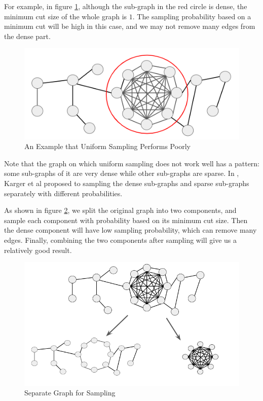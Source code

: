 \documentclass{article}
\begin{document}
For example, in figure \ref{fig:dense_spase}, although the sub-graph in the red circle is dense, the minimum cut size of the whole graph is $1$. The sampling probability based on a minimum cut will be high in this case, and we may not remove many edges from the dense part.

\begin{figure}[h!]
\centering
\includegraphics[scale=0.4]{images/dense_sparse_graph.png}
\caption{An Example that Uniform Sampling Performs Poorly}
\label{fig:dense_spase}
\end{figure}

Note that the graph on which uniform sampling does not work well has a pattern: some sub-graphs of it are very dense while other sub-graphs are sparse. In \cite{benczur2015randomized}, Karger et al proposed to sampling the dense sub-graphs and sparse sub-graphs separately with different probabilities. 

As shown in figure \ref{fig:separate_graph}, we split the original graph into two components, and sample each component with probability based on its minimum cut size. Then the dense component will have low sampling probability, which can remove many edges. Finally, combining the two components after sampling will give us a relatively good result.

\begin{figure}[h!]
\centering
\includegraphics[scale=0.4]{images/separate_graph.png}
\caption{Separate Graph for Sampling}
\label{fig:separate_graph}
\end{figure}
\end{document}

